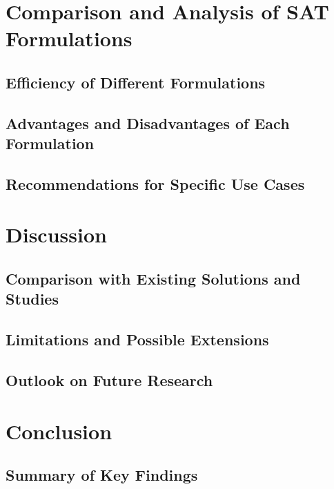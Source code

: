 \documentclass[bachelor, english]{algothesis}
\begin{document}
\chapter{Comparison and Analysis of SAT Formulations}

\section{Efficiency of Different Formulations}

\section{Advantages and Disadvantages of Each Formulation}

\section{Recommendations for Specific Use Cases}


\chapter{Discussion}

\section{Comparison with Existing Solutions and Studies}

\section{Limitations and Possible Extensions}

\section{Outlook on Future Research}


\chapter{Conclusion}

\section{Summary of Key Findings}

\clearpage


\end{document}
